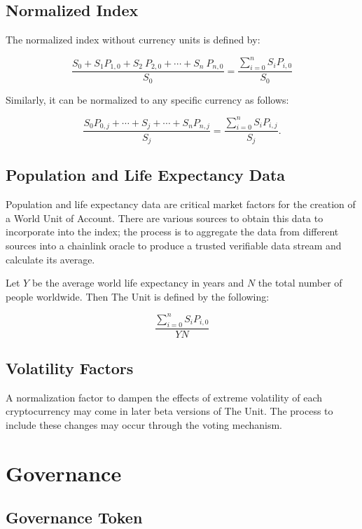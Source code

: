 \documentclass[12pt]{article}
\begin{document}
\subsection{Normalized Index}

The normalized index without currency units is defined by:

$$
\frac{S_0+S_1 P_{1,0}+ S_2\ P_{2,0}+\cdots+ S_n\ P_{n,0}}{S_0}= \frac{\sum_{i=0}^{n} S_iP_{i,0}}{S_0}
$$

Similarly, it can be normalized to any specific currency as follows:


$$
\frac{S_0P_{0,j}+\cdots+S_j+\cdots+S_nP_{n,j}}{S_j} = \frac{\sum_{i=0}^{n} S_iP_{i,j}}{S_j}.
$$



\subsection{Population and Life Expectancy Data}

Population and life expectancy data are critical market factors for the creation of a World Unit of Account. There are various sources to obtain this data to incorporate into the index; the process is to aggregate the data from different sources into a chainlink oracle to produce a trusted verifiable data stream and calculate its average. 


Let $Y$ be the average world life expectancy in years and $N$ the total number of people worldwide. Then The Unit is defined by the following:

$$
\frac{\displaystyle{\sum_{i=0}^{n} S_iP_{i,0}}}{Y N}
$$

\subsection{Volatility Factors}

A normalization factor to dampen the effects of extreme volatility of each cryptocurrency may come in later beta versions of The Unit. The process to include these changes may occur through the voting mechanism. 

\section{Governance}

\subsection{Governance Token}
\end{document}
